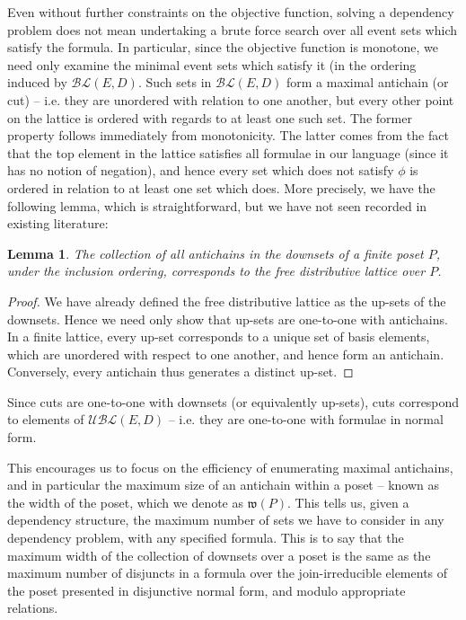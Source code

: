 \documentclass[hoptionsi,review,screen,format=sigconf]{acmart}
\newtheorem{lemma}[theorem]{Lemma}
\theoremstyle{definition}
\newcommand{\UBLc}{\mathcal{UBL}}
\newcommand{\BLc}{\mathcal{BL}}
\newcommand{\Wf}{\mathfrak{w}}
\begin{document}
Even without further constraints on the objective function, solving a dependency problem does not mean undertaking a brute force search over all event sets which satisfy the formula. In particular, since the objective function is monotone, we need only examine the minimal event sets which satisfy it (in the ordering induced by \(\BLc(E,D)\). Such sets in \(\BLc(E,D)\) form a maximal  antichain (or cut) -- i.e. they are unordered with relation to one another, but every other point on the lattice is ordered with regards to at least one such set. The former property follows immediately from monotonicity. The latter comes from the fact that the top element in the lattice satisfies all formulae in our language (since it has no notion of negation), and hence every set which does not satisfy \(\phi\) is ordered in relation to at least one set which does.  More precisely, we have the following lemma, which is straightforward, but we have not seen recorded in existing literature:

\begin{lemma}
The collection of all antichains in the downsets of a finite poset \(P\), under the inclusion ordering, corresponds to the free distributive lattice over \(P\).
\end{lemma}
\begin{proof}
We have already defined the free distributive lattice as the up-sets of the downsets. Hence we need only show that up-sets are one-to-one with antichains. In a finite lattice, every up-set corresponds to a unique set of basis elements, which are unordered with respect to one another, and hence form an antichain. Conversely, every antichain thus generates a distinct up-set.
\end{proof}

Since cuts are one-to-one with downsets (or equivalently up-sets), cuts correspond to elements of \(\UBLc(E,D)\) -- i.e. they are one-to-one with formulae in normal form.  

This encourages us to focus on the efficiency of enumerating maximal antichains, and in particular the maximum size of an antichain within a poset -- known as the width of the poset, which we denote as \(\Wf(P)\). This tells us, given a dependency structure, the maximum number of sets we have to consider in any dependency problem, with any specified formula. This is to say that the maximum width of the collection of downsets over a poset is the same as the maximum number of disjuncts in a formula over the join-irreducible elements of the poset presented in disjunctive normal form, and modulo appropriate relations.  
\end{document}
